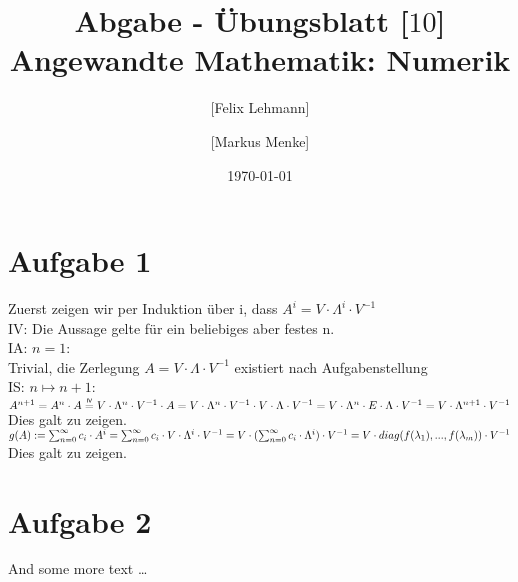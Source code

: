 \documentclass[10pt,a4paper]{article}
\newcommand\iv{\mathrel{\overset{\makebox[0pt]{\mbox{\normalfont\tiny\sffamily IV}}}{=}}}
\begin{document}
\title{Abgabe - Übungsblatt [$10$]\\
\small{Angewandte Mathematik: Numerik}}
\author{ [Felix Lehmann] \and [Markus Menke]}
\date{\today}
\maketitle

\section*{Aufgabe 1}
Zuerst zeigen wir per Induktion über i, dass $A^{i} = V \cdot \Lambda^{i} \cdot V^{-1}$\\
IV: Die Aussage gelte für ein beliebiges aber festes n.\\
IA: $n = 1$:\\
Trivial, die Zerlegung $A = V \cdot \Lambda \cdot V^{-1}$ existiert nach Aufgabenstellung\\
IS: $n \mapsto n+1$:\\
$A^{n+1} = A^{n} \cdot A \iv V \cdot \Lambda^{n} \cdot V^{-1} \cdot A = V \cdot \Lambda^{n} \cdot V^{-1} \cdot V \cdot \Lambda \cdot V^{-1}\\
= V \cdot \Lambda^{n} \cdot E \cdot \Lambda \cdot V^{-1} = V \cdot \Lambda^{n+1} \cdot V^{-1}$\\
Dies galt zu zeigen.\\

$g(A):=  \sum_{n=0}^{\infty} c_{i} \cdot A^{i} = \sum_{n=0}^{\infty} c_{i} \cdot V \cdot \Lambda^{i} \cdot V^{-1}\\
= V \cdot (\sum_{n=0}^{\infty} c_{i}\cdot\Lambda^{i}) \cdot V^{-1} = V \cdot diag(f(\lambda_{1}),...,f(\lambda_{m})) \cdot V^{-1} $\\
Dies galt zu zeigen.\\
 
\section*{Aufgabe 2}
And some more text \ldots
\end{document}
